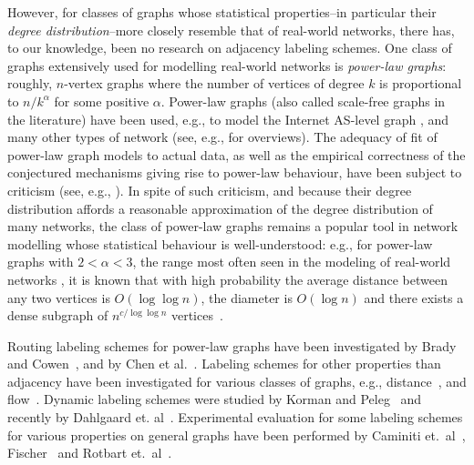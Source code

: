 However, for classes of graphs whose statistical properties--in particular their \emph{degree distribution}--more closely resemble that of real-world networks, there has, to our knowledge, been no research on adjacency labeling schemes.
One class of graphs extensively used for modelling real-world networks is \emph{power-law graphs}: roughly, $n$-vertex graphs where the number of vertices of degree $k$ is proportional to $n/k^{\alpha}$ for some positive $\alpha$. Power-law graphs (also called scale-free graphs in the literature) have been used, e.g., to model the Internet AS-level graph \cite{DBLP:journals/ton/SiganosFFF03,DBLP:conf/podc/AkellaCKS03}, and many other types of network (see, e.g., \cite{mitzenmacher2004brief,clauset2009power} for overviews). 
The adequacy of fit of power-law graph models to actual data, as well as the empirical correctness of the conjectured mechanisms giving rise to power-law behaviour, have been subject to criticism (see, e.g., \cite{DBLP:journals/jacm/AchlioptasCKM09,clauset2009power}). 
In spite of such criticism, and because their degree distribution affords a reasonable approximation of the degree distribution of many networks, the class of power-law graphs remains a popular tool in network modelling whose statistical behaviour is well-understood: e.g., for power-law graphs with $2<\alpha<3$, the range most often seen in the modeling of real-world networks \cite{clauset2009power}, it is known that with high probability the average distance between any two vertices is  $O(\log \log n)$, the diameter is $O(\log n)$ and there exists a dense subgraph of $n^{c/\log \log n}$ vertices~\cite{chung2004average}. 

Routing labeling schemes for power-law graphs  have been investigated by Brady and Cowen~\cite{brady2006compact}, and by Chen et al.~\cite{chen2012compact}. Labeling schemes for other properties than adjacency have been investigated for various classes of graphs, e.g., distance~\cite{gavoillea2004distance}, and flow~\cite{katz2004labeling}. 
Dynamic labeling schemes were studied by Korman and Peleg~\cite{korman2007compact,Korman07,korman2007general} and recently by Dahlgaard et. al~\cite{dahlgaard2014dynamic}.
Experimental evaluation for some labeling schemes for various properties on general graphs have been performed by Caminiti et.~al~\cite{caminiti2008engineering}, Fischer~\cite{fischer2009short} and Rotbart et.~al~\cite{rotbart2014evaluation}.

